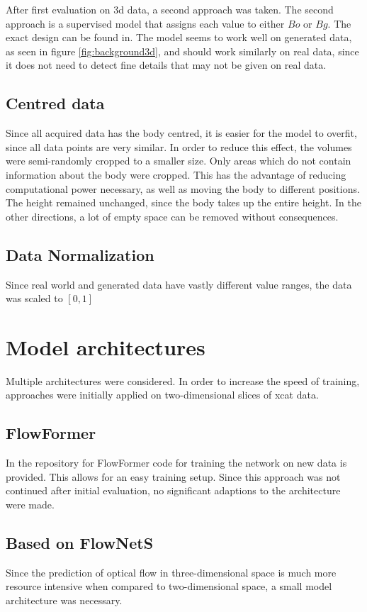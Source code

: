 After first evaluation on 3d data, a second approach was taken. The second approach is a supervised model that assigns each value to either $Bo$ or  $Bg$. The exact design can be found in. %
The model seems to work well on generated data, as seen in figure \eqref{fig:background3d}, and should work similarly on real data, since it does not need to detect fine details that may not be given on real data.
\subsection{Centred data}
Since all acquired data has the body centred, it is easier for the model to overfit, since all data points are very similar. In order to reduce this effect, the volumes were semi-randomly cropped to a smaller size. Only  areas which do not contain information about the body were cropped. This has the advantage of reducing computational power necessary, as well as moving the body to different positions. The height remained unchanged, since the body takes up the entire height. In the other directions, a lot of empty space can be removed without consequences.
\subsection{Data Normalization}
Since real world and generated data have vastly different value ranges, the data was scaled to $[0,1]$
\section{Model architectures}
Multiple architectures were considered. In order to increase the speed of training, approaches were initially applied on two-dimensional slices of xcat data.
\subsection{FlowFormer}
In the repository for FlowFormer\cite{drinkingcoderFlowFormerTransformerArchitecture2023} code for training the network on new data is provided. This allows for an easy training setup. Since this approach was not continued after initial evaluation, no significant adaptions to the architecture were made.
\subsection{Based on FlowNetS}
Since the prediction of optical flow in three-dimensional space is much more resource intensive when compared to  two-dimensional space, a small model architecture was necessary.

